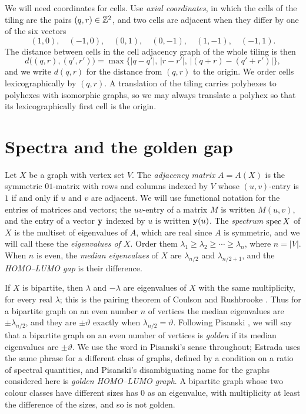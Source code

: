 \documentclass[11pt]{article}
\newcommand\thetaG{\vartheta}
\newcommand\spec{\opk{spec}}
\newcommand\abs[1]{\lvert #1\rvert}
\theoremstyle{definition}
\begin{document}
We will need coordinates for cells.  Use \textsl{axial coordinates}, in
which the cells of the tiling are the pairs $(q,r)\in{\mathbb Z}^2$, and two cells
are adjacent when they differ by one of the six vectors
\[
 (1,0),\quad(-1,0),\quad(0,1),\quad(0,-1),\quad(1,-1),\quad(-1,1).
\]
The distance between cells in the cell adjacency graph of the whole tiling is
then
\[
 d\bigl((q,r),(q',r')\bigr)
 =\max\bigl\{\abs{q-q'},\,\abs{r-r'},\,\abs{(q+r)-(q'+r')}\bigr\},
\]
and we write $d(q,r)$ for the distance from $(q,r)$ to the origin.  We order
cells lexicographically by $(q,r)$.  A translation of the tiling carries
polyhexes to polyhexes with isomorphic graphs, so we may always translate a
polyhex so that its lexicographically first cell is the origin.

\section{Spectra and the golden gap}\label{sec:spectral}

Let $X$ be a graph with vertex set $V$.  The \textsl{adjacency matrix} $A=A(X)$
is the symmetric $01$-matrix with rows and columns indexed by $V$ whose
$(u,v)$-entry is $1$ if and only if $u$ and $v$ are adjacent.  We will use
functional notation for the entries of matrices and vectors; the $uv$-entry
of a matrix $M$ is written $M(u,v)$, and the entry of a vector ${\mathbf y}$ indexed
by $u$ is written ${\mathbf y}(u)$.  The \textsl{spectrum} $\spec X$ of $X$ is the
multiset of eigenvalues of $A$, which are real since $A$ is symmetric, and
we will call these the \textsl{eigenvalues of $X$}.  Order them
$\lambda_1\ge\lambda_2\ge\cdots\ge\lambda_n$, where $n=\abs V$.  When $n$ is
even, the \textsl{median eigenvalues} of $X$ are $\lambda_{n/2}$ and
$\lambda_{n/2+1}$, and the \textsl{HOMO--LUMO gap} is their difference.

If $X$ is bipartite, then $\lambda$ and $-\lambda$ are eigenvalues of $X$
with the same multiplicity, for every real $\lambda$; this is the pairing
theorem of Coulson and Rushbrooke \cite{CouRus1940}.
Thus for a bipartite graph on an even number $n$ of vertices the median
eigenvalues are $\pm\lambda_{n/2}$, and they are $\pm\thetaG$ exactly when
$\lambda_{n/2}=\thetaG$.  Following Pisanski \cite{Pis2010}, we will say that
a bipartite graph on an even number of vertices is \textsl{golden} if its
median eigenvalues are
$\pm\thetaG$.  We use the word in Pisanski's sense throughout; Estrada
\cite{Est2007} uses the same phrase for a different class of graphs, defined
by a condition on a ratio of spectral quantities, and Pisanski's
disambiguating name for the graphs considered here is \textsl{golden
HOMO--LUMO graph}.  A bipartite graph whose two colour classes have different
sizes has $0$ as an eigenvalue, with multiplicity at least the difference of
the sizes, and so is not golden.
\end{document}
